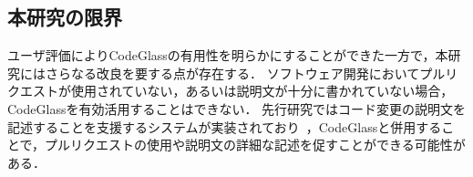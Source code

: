 \subsection{本研究の限界}

ユーザ評価によりCodeGlassの有用性を明らかにすることができた一方で，本研究にはさらなる改良を要する点が存在する．
ソフトウェア開発においてプルリクエストが使用されていない，あるいは説明文が十分に書かれていない場合，CodeGlassを有効活用することはできない．
先行研究ではコード変更の説明文を記述することを支援するシステムが実装されており~\cite{ChangeScribe}，CodeGlassと併用することで，プルリクエストの使用や説明文の詳細な記述を促すことができる可能性がある．







